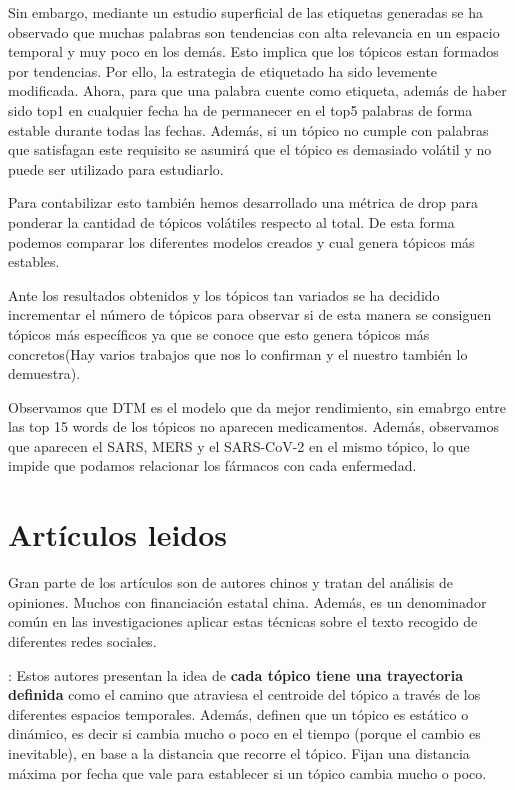 \documentclass[a4paper,10pt]{article}
\begin{document}
Sin embargo, mediante un estudio superficial de las etiquetas generadas se ha observado que muchas palabras son tendencias con alta relevancia en un espacio temporal y muy poco en los demás. Esto implica que los tópicos estan formados por tendencias. Por ello, la estrategia de etiquetado ha sido levemente modificada. Ahora, para que una palabra cuente como etiqueta, además de haber sido top1 en cualquier fecha ha de permanecer en el top5 palabras de forma estable durante todas las fechas. Además, si un tópico no cumple con palabras que satisfagan este requisito se asumirá que el tópico es demasiado volátil y no puede ser utilizado para estudiarlo.

Para contabilizar esto también hemos desarrollado una métrica de drop para ponderar la cantidad de tópicos volátiles respecto al total. De esta forma podemos comparar los diferentes modelos creados y cual genera tópicos más estables.


Ante los resultados obtenidos y los tópicos tan variados se ha decidido incrementar el número de tópicos para observar si de esta manera se consiguen tópicos más específicos ya que se conoce que esto genera tópicos más concretos(Hay varios trabajos que nos lo confirman y el nuestro también lo demuestra).


Observamos que DTM es el modelo que da mejor rendimiento, sin emabrgo entre las top 15 words de los tópicos no aparecen medicamentos. Además, observamos que aparecen el SARS, MERS y el SARS-CoV-2 en el mismo tópico, lo que impide que podamos relacionar los fármacos con cada enfermedad.




\section{Artículos leidos}

Gran parte de los artículos son de autores chinos y tratan del análisis de opiniones. Muchos con financiación estatal china. Además, es un denominador común en las investigaciones aplicar estas técnicas sobre el texto recogido de diferentes redes sociales.

\cite{Yao2020}: Estos autores presentan la idea de \textbf{cada tópico tiene una trayectoria definida} como el camino que atraviesa el centroide del tópico a través de los diferentes espacios temporales. Además, definen que un tópico es estático o dinámico, es decir si cambia mucho o poco en el tiempo (porque el cambio es inevitable), en base a la distancia que recorre el tópico. Fijan una distancia máxima por fecha que vale para establecer si un tópico cambia mucho o poco.
\end{document}
